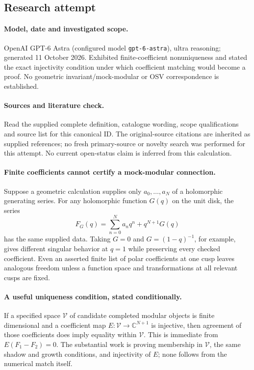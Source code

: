 \documentclass[11pt]{article}
\begin{document}
\subsection{Research attempt}
\paragraph{Model, date and investigated scope.}
OpenAI GPT-6 Astra (configured model \texttt{gpt-6-astra}), ultra reasoning; generated 11 October 2026. Exhibited finite-coefficient nonuniqueness and stated the exact injectivity condition under which coefficient matching would become a proof. No geometric invariant/mock-modular or OSV correspondence is established.

\paragraph{Sources and literature check.}
Read the supplied complete definition, catalogue wording, scope qualifications and source list for this canonical ID. The original-source citations are inherited as supplied references; no fresh primary-source or novelty search was performed for this attempt. No current open-status claim is inferred from this calculation.

\paragraph{Finite coefficients cannot certify a mock-modular connection.}Suppose a geometric calculation supplies only \(a_0,\ldots,a_N\) of a holomorphic generating series. For any holomorphic function \(G(q)\) on the unit disk, the series
\[F_G(q)=\sum_{n=0}^Na_nq^n+q^{N+1}G(q)
\]
has the same supplied data. Taking \(G=0\) and \(G=(1-q)^{-1}\), for example, gives different singular behavior at \(q=1\) while preserving every checked coefficient. Even an asserted finite list of polar coefficients at one cusp leaves analogous freedom unless a function space and transformations at all relevant cusps are fixed.
\paragraph{A useful uniqueness condition, stated conditionally.}If a specified space \(\mathcal V\) of candidate completed modular objects is finite dimensional and a coefficient map \(E:\mathcal V\to\mathbb C^{N+1}\) is injective, then agreement of those coefficients does imply equality within \(\mathcal V\). This is immediate from \(E(F_1-F_2)=0\). The substantial work is proving membership in \(\mathcal V\), the same shadow and growth conditions, and injectivity of \(E\); none follows from the numerical match itself.
\end{document}
